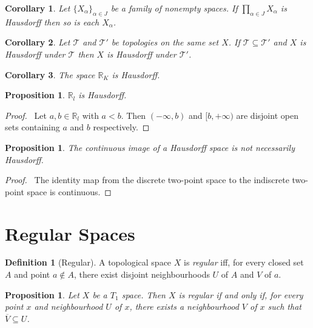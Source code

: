 \documentclass{report}
\let\qed\relax
\newtheorem{prop}[lm]{Proposition}
\newtheorem{cor}{Corollary}[lm]
\theoremstyle{definition}
\newtheorem{df}[lm]{Definition}
\begin{document}
  \begin{cor}
    Let $\{ X_\alpha \}_{\alpha \in J}$ be a family of nonempty spaces. If
    $\prod_{\alpha \in J} X_\alpha$ is Hausdorff then so is each $X_\alpha$.
  \end{cor}

  \begin{cor}
    Let $\mathcal{T}$ and $\mathcal{T}'$ be topologies on the same set $X$. If
    $\mathcal{T} \subseteq \mathcal{T}'$ and $X$ is Hausdorff under
    $\mathcal{T}$ then $X$ is Hausdorff under $\mathcal{T}'$.
  \end{cor}

  \begin{cor}
    The space $\mathbb{R}_K$ is Hausdorff.
  \end{cor}

   \begin{prop}
   $\mathbb{R}_l$ is Hausdorff.
 \end{prop}

 \begin{proof}
   \pf\ Let $a, b \in \mathbb{R}_l$ with $a < b$. Then $(- \infty, b)$ and $[b,
+\infty)$ are disjoint open sets containing $a$ and $b$ respectively. \qed
 \end{proof}

 \begin{prop}
   The continuous image of a Hausdorff space is not necessarily Hausdorff.
 \end{prop}

 \begin{proof}
   \pf\ The identity map from the discrete two-point space to the indiscrete two-point space is continuous. \qed
 \end{proof}

  \section{Regular Spaces}

  \begin{df}[Regular]
    A topological space $X$ is \emph{regular} iff, for every closed set $A$ and
    point $a \notin A$, there exist disjoint neighbourhoods $U$ of $A$ and $V$
    of
    $a$.
  \end{df}

    \begin{prop}
      \label{prop:topology:regular:closure}
   Let $X$ be a $T_1$ space. Then $X$ is regular if and only if, for every
point $x$ and neighbourhood $U$ of $x$, there exists a neighbourhood $V$ of $x$
such that $\overline{V} \subseteq U$.
  \end{prop}
\end{document}

